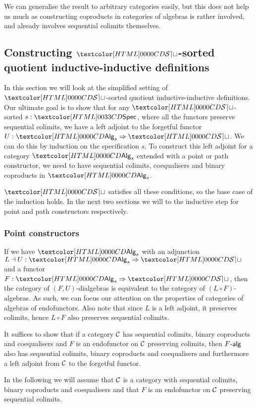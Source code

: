 We can generalise the result to arbitrary categories easily, but this
does not help us much as constructing coproducts in categories of
algebras is rather involved, and already involves sequential colimits
themselves.

\subsection{Constructing $\SET$-sorted quotient inductive-inductive definitions}

In this section we will look at the simplified setting of $\SET$-sorted quotient
inductive-inductive definitions. Our ultimate goal is to show that for
any $\SET$-sorted $s : \specty$, where all the functors preserve
sequential colimits, we have a left adjoint to the forgetful functor
$U : \Func{\Alg_s}{\SET}$. We can do this by induction on the
specification $s$. To construct this left adjoint for a category
$\Alg_s$ extended with a point or path constructor, we need to have
sequential colimits, coequalisers and binary coproducts in $\Alg_s$.

$\SET$ satisfies all these conditions, so the base case of the
induction holds. In the next two sections we will to the inductive
step for point and path constructors respectively.

\subsubsection{Point constructors}

If we have $\Alg_s$ with an adjunction
$L \dashv U : \Func{\Alg_s}{\SET}$ and a functor
$F : \Func{\Alg_s}{\SET}$, then the category of $(F,U)$-dialgebras is
equivalent to the category of $(L \circ F)$-algebras. As such, we can
focus our attention on the properties of categories of algebras of
endofunctors. Also note that since $L$ is a left adjoint, it preserves
colimits, hence $L \circ F$ also preserves sequential colimits.

It suffices to show that if a category $\mathcal{C}$ has sequential colimits,
binary coproducts and coequalisers and $F$ is an endofunctor on $\mathcal{C}$
preserving colimits, then $\algcat{F}$ also has sequential colimits,
binary coproducts and coequalisers and furthermore a left adjoint from
$\mathcal{C}$ to the forgetful functor.

In the following we will assume that $\mathcal{C}$ is a category with
sequential colimits, binary coproducts and coequalisers and that $F$
is an endofunctor on $\mathcal{C}$ preserving sequential colimits.

